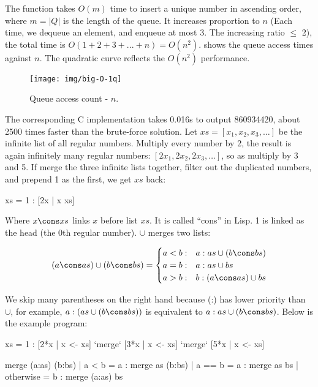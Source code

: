 \documentclass[b5paper]{article}
\begin{document}
The  function takes $O(m)$ time to insert a unique number in ascending order, where $m = |Q|$ is the length of the queue. It increases proportion to $n$ (Each time, we dequeue an element, and enqueue at most 3. The increasing ratio $\leq$ 2), the total time is $O(1 + 2 + 3 + ... + n) = O(n^2)$.  shows the queue access times against $n$. The quadratic curve reflects the $O(n^2)$ performance.

\begin{figure}[htbp]
  \centering
  \texttt{[image: img/big-O-1q]}
  \caption{Queue access count - $n$.}
  \label{fig:big-O-1q}
\end{figure}

The corresponding C implementation takes 0.016s to output 860934420, about 2500 times faster than the brute-force solution. Let $xs = [x_1, x_2, x_3, \dotsc]$ be the infinite list of all regular numbers. Multiply every number by 2, the result is again infinitely many regular numbers: $[2x_1, 2x_2, 2x_3, \dotsc]$, so as multiply by 3 and 5. If merge the three infinite lists together, filter out the duplicated numbers, and prepend 1 as the first, we get $xs$ back:

\be
  xs = 1 : [2x | x \gets xs] \cup [3x | x \gets xs] \cup [5x | x \gets xs]
\ee

Where $x \cons xs$ links $x$ before list $xs$. It is called \enquote{cons} in Lisp. 1 is linked as the head (the 0th regular number). $\cup$ merges two lists:

\[
(a \cons as) \cup (b \cons bs) = \begin{cases}
  a < b: & a : as \cup (b \cons bs) \\
  a = b: & a : as \cup bs \\
  a > b: & b : (a \cons as) \cup bs
\end{cases}
\]

We skip many parentheses on the right hand because (:) has lower priority than $\cup$, for example, $a : (as \cup (b \cons bs))$ is equivalent to $a : as \cup (b \cons bs)$. Below is the example program:

\begin{Haskell}
xs = 1 : [2*x | x <- xs] `merge` [3*x | x <- xs] `merge` [5*x | x <- xs]

merge (a:as) (b:bs) | a < b     = a : merge as (b:bs)
                    | a == b    = a : merge as bs
                    | otherwise = b : merge (a:as) bs
\end{Haskell}
\end{document}
